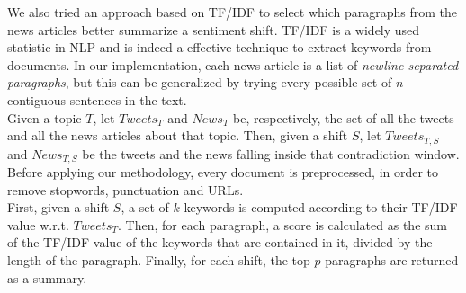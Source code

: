 We also tried an approach based on TF/IDF to select which paragraphs from the news articles better summarize a sentiment shift. TF/IDF is a widely used statistic in NLP and is indeed a effective technique to extract keywords from documents. In our implementation, each news article is a list of \emph{newline-separated paragraphs}, but this can be generalized by trying every possible set of $n$ contiguous sentences in the text.
\\
Given a topic $T$, let $Tweets_T$ and $News_T$ be, respectively, the set of all the tweets and all the news articles about that topic. Then, given a shift $S$, let $Tweets_{T,S}$ and $News_{T,S}$ be the tweets and the news falling inside that contradiction window. Before applying our methodology, every document is preprocessed, in order to remove stopwords, punctuation and URLs.
\\
First, given a shift $S$, a set of $k$ keywords is computed according to their TF/IDF value w.r.t. $Tweets_T$. Then, for each paragraph, a score is calculated as the sum of the TF/IDF value of the keywords that are contained in it, divided by the length of the paragraph. Finally, for each shift, the top $p$ paragraphs are returned as a summary.
\\\\
